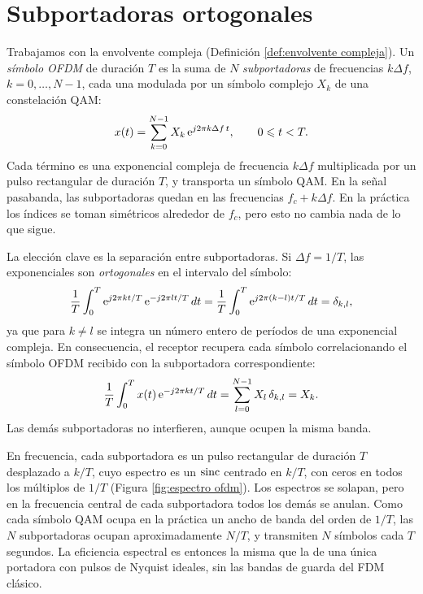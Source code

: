 \section{Subportadoras ortogonales}\label{sec:ofdm ortogonalidad}

Trabajamos con la envolvente compleja (Definición \ref{def:envolvente compleja}). Un \emph{símbolo OFDM} de duración $T$ es la suma de $N$ \emph{subportadoras} de frecuencias $k\Delta f$, $k=0,\ldots,N-1$, cada una modulada por un símbolo complejo $X_k$ de una constelación QAM:
\begin{equation}\label{eq:simbolo ofdm}
    x(t) = \sum_{k=0}^{N-1} X_k\,\mathrm{e}^{j2\pi k\Delta f\,t}, \qquad 0\leqslant t<T.
\end{equation}
Cada término es una exponencial compleja de frecuencia $k\Delta f$ multiplicada por un pulso rectangular de duración $T$, y transporta un símbolo QAM. En la señal pasabanda, las subportadoras quedan en las frecuencias $f_c+k\Delta f$. En la práctica los índices se toman simétricos alrededor de $f_c$, pero esto no cambia nada de lo que sigue.

La elección clave es la separación entre subportadoras. Si $\Delta f=1/T$, las exponenciales son \emph{ortogonales} en el intervalo del símbolo:
\begin{equation}\label{eq:ortogonalidad ofdm}
    \frac{1}{T}\int_0^T \mathrm{e}^{j2\pi k t/T}\,\mathrm{e}^{-j2\pi l t/T}\,dt = \frac{1}{T}\int_0^T \mathrm{e}^{j2\pi (k-l) t/T}\,dt = \delta_{k,l},
\end{equation}
ya que para $k\neq l$ se integra un número entero de períodos de una exponencial compleja. En consecuencia, el receptor recupera cada símbolo correlacionando el símbolo OFDM recibido con la subportadora correspondiente:
\begin{equation}\label{eq:demodulacion ofdm}
    \frac{1}{T}\int_0^T x(t)\,\mathrm{e}^{-j2\pi k t/T}\,dt = \sum_{l=0}^{N-1}X_l\,\delta_{k,l} = X_k.
\end{equation}
Las demás subportadoras no interfieren, aunque ocupen la misma banda.

En frecuencia, cada subportadora es un pulso rectangular de duración $T$ desplazado a $k/T$, cuyo espectro es un $\operatorname{sinc}$ centrado en $k/T$, con ceros en todos los múltiplos de $1/T$ (Figura \ref{fig:espectro ofdm}). Los espectros se solapan, pero en la frecuencia central de cada subportadora todos los demás se anulan. Como cada símbolo QAM ocupa en la práctica un ancho de banda del orden de $1/T$, las $N$ subportadoras ocupan aproximadamente $N/T$, y transmiten $N$ símbolos cada $T$ segundos. La eficiencia espectral es entonces la misma que la de una única portadora con pulsos de Nyquist ideales, sin las bandas de guarda del FDM clásico.

